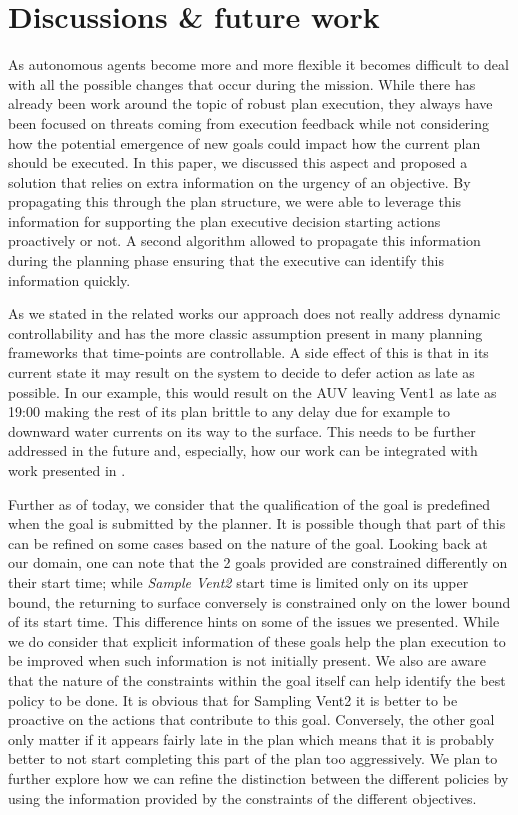 \section{Discussions \& future work}
\label{sec:conclude}

As autonomous agents become more and more flexible it becomes difficult
to deal with all the possible changes that occur during the
mission. While there has already been work around the topic of robust
plan execution, they always have been focused on threats coming from
execution feedback while not considering how the potential emergence of
new goals could impact how the current plan should be executed. In this
paper, we discussed this aspect and proposed a solution that relies on
extra information on the urgency of an objective. By propagating this
through the plan structure, we were able to leverage this information for
supporting the plan executive decision starting actions proactively or
not. A second algorithm allowed to propagate this information during the
planning phase ensuring that the executive can identify this information
quickly.

 As we stated in the related works our approach does not
really address dynamic controllability and has the more classic
assumption present in many planning frameworks that time-points are
controllable. A side effect of this is that in its current state it
may result on the system to decide to defer action as late as
possible. In our example, this would result on the AUV leaving Vent1
as late as 19:00 making the rest of its plan brittle to any delay due
for example to downward water currents on its way to the surface. This
needs to be further addressed in the future and, especially, how our
work can be integrated with work presented in \cite{morris01}.

Further as of today, we consider that the qualification of the goal is
predefined when the goal is submitted by the planner. It is possible
though that part of this can be refined on some cases based on the
nature of the goal. Looking back at our domain, one can note that the
2 goals provided are constrained differently on their start time;
while {\em Sample Vent2} start time is limited only on its upper
bound, the returning to surface conversely is constrained only on the
lower bound of its start time. This difference hints on some of the
issues we presented. While we do consider that explicit information of
these goals help the plan execution to be improved when such
information is not initially present. We also are aware that the
nature of the constraints within the goal itself can help identify the
best policy to be done. It is obvious that for Sampling Vent2 it is
better to be proactive on the actions that contribute to this
goal. Conversely, the other goal only matter if it appears fairly late
in the plan which means that it is probably better to not start
completing this part of the plan too aggressively. We plan to further
explore how we can refine the distinction between the different
policies by using the information provided by the constraints of the
different objectives.
 
